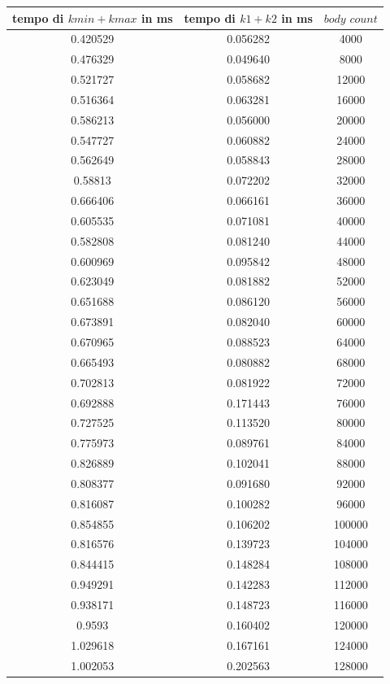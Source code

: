 \documentclass{article}
\begin{document}
	\begin{table}[h]
		\centering
		\begin{tabular}{c|c|c}
			tempo di $kmin + kmax$ in ms & tempo di $k1+k2$ in ms & $\textit{body count}$\\
			\hline
			0.420529 & 0.056282 &   4000 \\
			0.476329 & 0.049640 &   8000 \\
			0.521727 & 0.058682 &  12000 \\
			0.516364 & 0.063281 &  16000 \\
			0.586213 & 0.056000 &  20000 \\
			0.547727 & 0.060882 &  24000 \\
			0.562649 & 0.058843 &  28000 \\
			0.58813 & 0.072202 &  32000 \\
			0.666406 & 0.066161 &  36000 \\
			0.605535 & 0.071081 &  40000 \\
			0.582808 & 0.081240 &  44000 \\
			0.600969 & 0.095842 &  48000 \\
			0.623049 & 0.081882 &  52000 \\
			0.651688 & 0.086120 &  56000 \\
			0.673891 & 0.082040 &  60000 \\
			0.670965 & 0.088523 &  64000 \\
			0.665493 & 0.080882 &  68000 \\
			0.702813 & 0.081922 &  72000 \\
			0.692888 & 0.171443 &  76000 \\
			0.727525 & 0.113520 &  80000 \\
			0.775973 & 0.089761 &  84000 \\
			0.826889 & 0.102041 &  88000 \\
			0.808377 & 0.091680 &  92000 \\
			0.816087 & 0.100282 &  96000 \\
			0.854855 & 0.106202 & 100000 \\
			0.816576 & 0.139723 & 104000 \\
			0.844415 & 0.148284 & 108000 \\
			0.949291 & 0.142283 & 112000 \\
			0.938171 & 0.148723 & 116000 \\
			0.9593 & 0.160402 & 120000 \\
			1.029618 & 0.167161 & 124000 \\
			1.002053 & 0.202563 & 128000 \\

\end{tabular}
\end{table}
\end{document}
